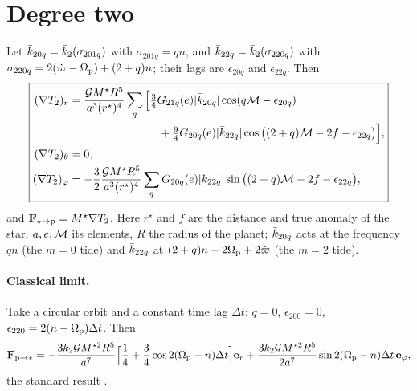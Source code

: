 \section{Degree two}
Let $\bar k_{20q}=\bar k_2(\sigma_{201q})$ with $\sigma_{201q}=qn$, and $\bar k_{22q}=\bar k_2(\sigma_{220q})$ with $\sigma_{220q}=2(\dot\varpi-\Omega_{\mathrm p})+(2+q)n$; their lags are $\epsilon_{20q}$ and $\epsilon_{22q}$. Then
\begin{equation}
  \boxed{\begin{aligned}
  (\nabla T_2)_r&=\frac{\mathcal{G} M^\star R^5}{a^3(r^\star)^4}\sum_{q}\Big[\tfrac34G_{21q}(e)|\bar k_{20q}|\cos(q\mathcal{M}-\epsilon_{20q})\\
  &\hspace{8em}+\tfrac94G_{20q}(e)|\bar k_{22q}|\cos\big((2+q)\mathcal{M}-2f-\epsilon_{22q}\big)\Big],\\
  (\nabla T_2)_\theta&=0,\\
  (\nabla T_2)_\varphi&=-\frac32\frac{\mathcal{G} M^\star R^5}{a^3(r^\star)^4}\sum_qG_{20q}(e)|\bar k_{22q}|\sin\big((2+q)\mathcal{M}-2f-\epsilon_{22q}\big),
  \end{aligned}} \label{eq:coplanar-l2}
\end{equation}
and $\mathbf F_{\star\to\mathrm p}=M^\star\nabla T_2$. Here $r^\star$ and $f$ are the distance and true anomaly of the star, $a,e,\mathcal{M}$ its elements, $R$ the radius of the planet; $\bar k_{20q}$ acts at the frequency $qn$ (the $m=0$ tide) and $\bar k_{22q}$ at $(2+q)n-2\Omega_{\mathrm p}+2\dot\varpi$ (the $m=2$ tide).

\paragraph{Classical limit.} Take a circular orbit and a constant time lag $\Delta t$: $q=0$, $\epsilon_{200}=0$, $\epsilon_{220}=2(n-\Omega_{\mathrm p})\Delta t$. Then
\[
  \mathbf F_{\mathrm p\to\star}=-\frac{3k_2\mathcal{G} M^{\star2}R^5}{a^7}\Big[\frac14+\frac34\cos2(\Omega_{\mathrm p}-n)\Delta t\Big]\mathbf e_r+\frac{3k_2\mathcal{G} M^{\star2}R^5}{2a^7}\sin2(\Omega_{\mathrm p}-n)\Delta t\,\mathbf e_\varphi,
\]
the standard result \citep{Hut1981}.
